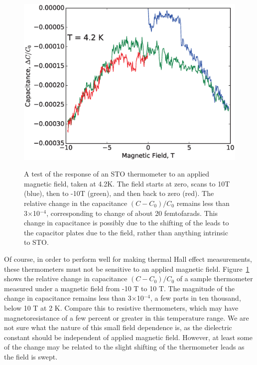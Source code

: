 \documentclass{thesis-umich}
\begin{document}
\begin{figure} \caption[Field response of an STO thermometer]{A test of the response of an STO thermometer to an
    applied magnetic field, taken at 4.2K.  The field starts at zero, scans to
    10T (blue), then to -10T (green), and then back to zero (red).  The relative
    change in the capacitance $(C - C_0)/C_0$ remains less than
  3$\times$10$^{-4}$, corresponding to change of about 20 femtofarads. This
change in capacitance is possibly due to the shifting of the leads to the
capacitor plates due to the field, rather than anything intrinsic to STO.}
\centering \includegraphics[width=\columnwidth]{figures/cvb_apl.eps}\label{b_test}
\end{figure}

Of course, in order to perform well for making thermal Hall effect measurements,
these thermometers must not be sensitive to an applied magnetic field.
Figure~\ref{b_test} shows the relative change in capacitance $(C-C_0)/C_0$ of a
sample thermometer measured under a magnetic field from -10 T to 10 T.  The
magnitude of the change in capacitance remains less than 3$\times$10$^{-4}$, a
few parts in ten thousand, below 10 T at 2 K. Compare this to resistive
thermometers, which may have magnetoresistance of a few percent or greater in
this temperature range\cite{Heine1998,Goodrich1998}. We are not sure what the nature
of this small field dependence is, as the dielectric constant should be
independent of applied magnetic field. However, at least some of the change may
be related to the slight shifting of the thermometer leads as the field is
swept.
\end{document}
